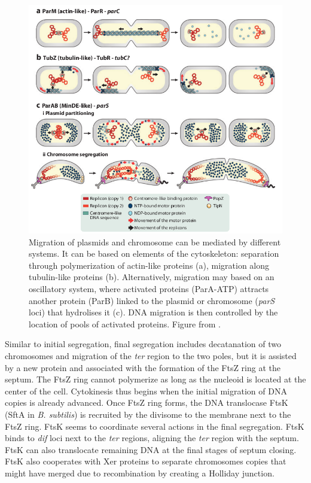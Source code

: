 \begin{figure}[!ht]
	\centering
	\includegraphics[width=0.8\linewidth]{figure/DNAmigration}
	\caption{Migration of plasmids and chromosome can be mediated by different systems. It can be based on elements of the cytoskeleton: separation through polymerization of actin-like proteins (a), migration along tubulin-like proteins (b). Alternatively, migration may based on an oscillatory system, where activated proteins (ParA-ATP) attracts another protein (ParB) linked to the plasmid or chromosome (\textit{parS} loci) that hydrolises it (c). DNA migration is then controlled by the location of pools of activated proteins. Figure from \citet{reyes-lamothe_chromosome_2012}.}
	\label{fig:dnaMigration}
\end{figure}

Similar to initial segregation, final segregation includes decatanation of two chromosomes and migration of the \textit{ter} region to the two poles, but it is assisted by a new protein and associated with the formation of the FtsZ ring at the septum. The FtsZ ring cannot polymerize as long as the nucleoid is located at the center of the cell. Cytokinesis thus begins when the initial migration of DNA copies is already advanced. Once FtsZ ring forms, the DNA translocase FtsK (SftA in \textit{B. subtilis}) is recruited by the divisome to the membrane next to the FtsZ ring. FtsK seems to coordinate several actions in the final segregation. FtsK binds to \textit{dif} loci next to the \textit{ter} regions, aligning the \textit{ter} region with the septum. FtsK can also translocate remaining DNA at the final stages of septum closing. FtsK also cooperates with Xer proteins to separate chromosomes copies that might have merged due to recombination by creating a Holliday junction.
 

